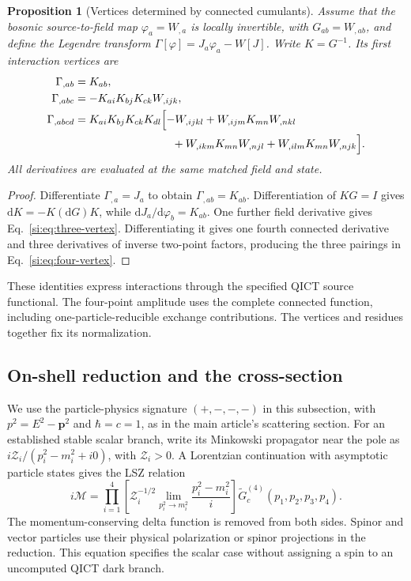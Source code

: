 \documentclass[11pt,a4paper]{article}
\newtheorem{proposition}{Proposition}\renewcommand{\theproposition}{S\arabic{proposition}}
\newcommand{\dd}{\mathrm{d}}\DeclareMathOperator{\Tr}{Tr}
\begin{document}
\begin{proposition}[Vertices determined by connected cumulants]\label{si:prop:vertices}
Assume that the bosonic source-to-field map $\varphi_a=W_{,a}$ is locally invertible, with $G_{ab}=W_{,ab}$, and define the Legendre transform $\Gamma[\varphi]=J_a\varphi_a-W[J]$. Write $K=G^{-1}$. Its first interaction vertices are
\begin{align}
\Gamma_{,ab}&=K_{ab},\\
\Gamma_{,abc}&=-K_{ai}K_{bj}K_{ck}W_{,ijk},\label{si:eq:three-vertex}\\
\Gamma_{,abcd}&=K_{ai}K_{bj}K_{ck}K_{dl}
\Bigl[-W_{,ijkl}+W_{,ijm}K_{mn}W_{,nkl}\nonumber\\
&\hspace{31mm}+W_{,ikm}K_{mn}W_{,njl}
+W_{,ilm}K_{mn}W_{,njk}\Bigr].\label{si:eq:four-vertex}
\end{align}
All derivatives are evaluated at the same matched field and state.
\end{proposition}
\begin{proof}
Differentiate $\Gamma_{,a}=J_a$ to obtain $\Gamma_{,ab}=K_{ab}$. Differentiation of $KG=I$ gives $\dd K=-K(\dd G)K$, while $\dd J_a/\dd\varphi_b=K_{ab}$. One further field derivative gives Eq.~\eqref{si:eq:three-vertex}. Differentiating it gives one fourth connected derivative and three derivatives of inverse two-point factors, producing the three pairings in Eq.~\eqref{si:eq:four-vertex}.
\end{proof}
These identities express interactions through the specified QICT source functional. The four-point amplitude uses the complete connected function, including one-particle-reducible exchange contributions. The vertices and residues together fix its normalization.

\subsection{On-shell reduction and the cross-section}
We use the particle-physics signature $(+,-,-,-)$ in this subsection, with $p^2=E^2-\mathbf p^2$ and $\hbar=c=1$, as in the main article's scattering section. For an established stable scalar branch, write its Minkowski propagator near the pole as $i\mathcal Z_i/(p_i^2-m_i^2+i0)$, with $\mathcal Z_i>0$. A Lorentzian continuation with asymptotic particle states gives the LSZ relation \cite{Tong}
\begin{equation}\label{si:eq:lsz}
i\mathcal M=\prod_{i=1}^4\left[\mathcal Z_i^{-1/2}
\lim_{p_i^2\to m_i^2}\frac{p_i^2-m_i^2}{i}\right]
\widetilde G_c^{(4)}(p_1,p_2,p_3,p_4).
\end{equation}
The momentum-conserving delta function is removed from both sides. Spinor and vector particles use their physical polarization or spinor projections in the reduction. This equation specifies the scalar case without assigning a spin to an uncomputed QICT dark branch.
\end{document}
